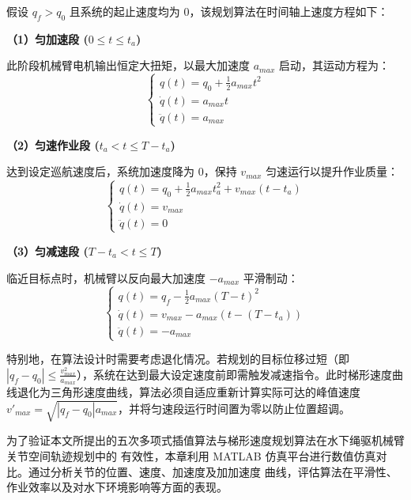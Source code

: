 假设 $q_f > q_0$ 且系统的起止速度均为 $0$，该规划算法在时间轴上速度方程如下：

\textbf{（1）匀加速段 ($0 \le t \le t_a$)}

此阶段机械臂电机输出恒定大扭矩，以最大加速度 $a_{max}$ 启动，其运动方程为：
\begin{equation}
    \begin{cases}
        q(t) = q_0 + \frac{1}{2} a_{max} t^2 \\
        \dot{q}(t) = a_{max} t \\
        \ddot{q}(t) = a_{max}
    \end{cases}
\end{equation}

\textbf{（2）匀速作业段 ($t_a < t \le T - t_a$)}

达到设定巡航速度后，系统加速度降为 $0$，保持 $v_{max}$ 匀速运行以提升作业质量：
\begin{equation}
    \begin{cases}
        q(t) = q_0 + \frac{1}{2} a_{max} t_a^2 + v_{max} (t - t_a) \\
        \dot{q}(t) = v_{max} \\
        \ddot{q}(t) = 0
    \end{cases}
\end{equation}

\textbf{（3）匀减速段 ($T - t_a < t \le T$)}

临近目标点时，机械臂以反向最大加速度 $-a_{max}$ 平滑制动：
\begin{equation}
    \begin{cases}
        q(t) = q_f - \frac{1}{2} a_{max} (T - t)^2 \\
        \dot{q}(t) = v_{max} - a_{max}(t - (T - t_a)) \\
        \ddot{q}(t) = -a_{max}
    \end{cases}
\end{equation}

特别地，在算法设计时需要考虑退化情况。若规划的目标位移过短（即 $|q_f - q_0| \le \frac{v_{max}^2}{a_{max}}$），系统在达到最大设定速度前即需触发减速指令。此时梯形速度曲线退化为三角形速度曲线，算法必须自适应重新计算实际可达的峰值速度 $v'_{max} = \sqrt{|q_f - q_0| a_{max}}$，并将匀速段运行时间置为零以防止位置超调。



为了验证本文所提出的五次多项式插值算法与梯形速度规划算法在水下绳驱机械臂关节空间轨迹规划中的
有效性，本章利用 MATLAB 仿真平台进行数值仿真对比。通过分析关节的位置、速度、加速度及加加速度
曲线，评估算法在平滑性、作业效率以及对水下环境影响等方面的表现。

